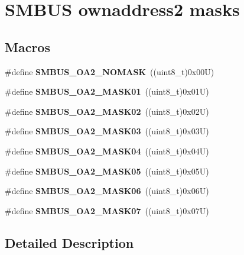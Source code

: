 \hypertarget{group___s_m_b_u_s__own__address2__masks}{}\section{S\+M\+B\+US ownaddress2 masks}
\label{group___s_m_b_u_s__own__address2__masks}
\subsection*{Macros}
\begin{DoxyCompactItemize}
\item 
\mbox{\label{group___s_m_b_u_s__own__address2__masks_gaa46a57e8acccccabbb4179b3a93f0cf6}} 
\#define {\bfseries S\+M\+B\+U\+S\+\_\+\+O\+A2\+\_\+\+N\+O\+M\+A\+SK}~((uint8\+\_\+t)0x00\+U)
\item 
\mbox{\label{group___s_m_b_u_s__own__address2__masks_gaf8c2257240c6e36b22136d037df9b482}} 
\#define {\bfseries S\+M\+B\+U\+S\+\_\+\+O\+A2\+\_\+\+M\+A\+S\+K01}~((uint8\+\_\+t)0x01\+U)
\item 
\mbox{\label{group___s_m_b_u_s__own__address2__masks_ga2bd705521f51b714d2c4a5ed5425a314}} 
\#define {\bfseries S\+M\+B\+U\+S\+\_\+\+O\+A2\+\_\+\+M\+A\+S\+K02}~((uint8\+\_\+t)0x02\+U)
\item 
\mbox{\label{group___s_m_b_u_s__own__address2__masks_ga5b8079aeaffbda66204e37d2e3e94ed3}} 
\#define {\bfseries S\+M\+B\+U\+S\+\_\+\+O\+A2\+\_\+\+M\+A\+S\+K03}~((uint8\+\_\+t)0x03\+U)
\item 
\mbox{\label{group___s_m_b_u_s__own__address2__masks_ga569d234db96a6ff0a02aeca4bd044944}} 
\#define {\bfseries S\+M\+B\+U\+S\+\_\+\+O\+A2\+\_\+\+M\+A\+S\+K04}~((uint8\+\_\+t)0x04\+U)
\item 
\mbox{\label{group___s_m_b_u_s__own__address2__masks_ga8ec58410cf437d788a9aa1ae80337d5b}} 
\#define {\bfseries S\+M\+B\+U\+S\+\_\+\+O\+A2\+\_\+\+M\+A\+S\+K05}~((uint8\+\_\+t)0x05\+U)
\item 
\mbox{\label{group___s_m_b_u_s__own__address2__masks_gacd7a8d5aa4125a6ad0a105866bfbe643}} 
\#define {\bfseries S\+M\+B\+U\+S\+\_\+\+O\+A2\+\_\+\+M\+A\+S\+K06}~((uint8\+\_\+t)0x06\+U)
\item 
\mbox{\label{group___s_m_b_u_s__own__address2__masks_ga229bc8bc648002751d3185a3dc1dd7e6}} 
\#define {\bfseries S\+M\+B\+U\+S\+\_\+\+O\+A2\+\_\+\+M\+A\+S\+K07}~((uint8\+\_\+t)0x07\+U)
\end{DoxyCompactItemize}


\subsection{Detailed Description}
